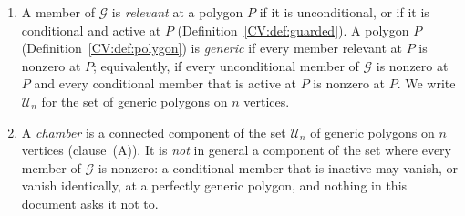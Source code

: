 \begin{definition}\label{CV:def:generic}\leanok{}
\begin{enumerate}
\item[(A)] A member of $\mathcal G$ is \emph{relevant} at a polygon $P$ if it is
unconditional, or if it is conditional and active at $P$
(Definition~\ref{CV:def:guarded}). A polygon $P$
(Definition~\ref{CV:def:polygon}) is \emph{generic} if every member relevant at
$P$ is nonzero at $P$; equivalently, if every unconditional member of
$\mathcal G$ is nonzero at $P$ and every conditional member that is active at
$P$ is nonzero at $P$. We write $\mathcal U_n$ for the set of generic polygons
on $n$ vertices.

\item[(B)] A \emph{chamber} is a connected component of the set $\mathcal U_n$ of generic
polygons on $n$ vertices (clause~(A)). It is \emph{not} in
general a component of the set where every member of $\mathcal G$ is nonzero:
a conditional member that is inactive may vanish, or vanish identically, at a
perfectly generic polygon, and nothing in this document asks it not to.
\end{enumerate}
\end{definition}

